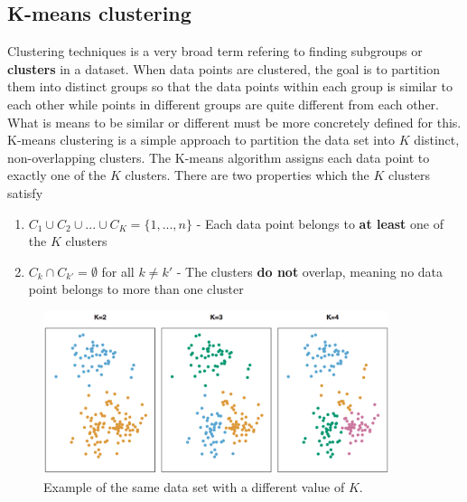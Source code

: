 \documentclass[CS5104-Notes.tex]{subfiles}
\begin{document}
\subsection{K-means clustering}
Clustering techniques is a very broad term refering to finding subgroups or \textbf{clusters} in a dataset. When data points are clustered, the goal is to partition them into distinct groups so that the data points within each group is similar to each other while points in different groups are quite different from each other. What is means to be similar or different must be more concretely defined for this.
\n
K-means clustering is a simple approach to partition the data set into $K$ distinct, non-overlapping clusters. The K-means algorithm assigns each data point to exactly one of the $K$ clusters. There are two properties which the $K$ clusters satisfy
\begin{enumerate}
\item $C_{1} \cup C_{2} \cup ... \cup C_{K} = \{1, ..., n\}$ - Each data point belongs to \textbf{at least} one of the $K$ clusters
\item $C_{k} \cap C_{k'} = \emptyset$ for all $k \neq k'$ - The clusters \textbf{do not} overlap, meaning no data point belongs to more than one cluster
\end{enumerate}
\begin{figure}[H]
  \centering
  \includegraphics[width=0.9\textwidth, keepaspectratio]{imgs/different-k-means-clustering.png}
  \caption{Example of the same data set with a different value of $K$.}
\end{figure}
\end{document}
